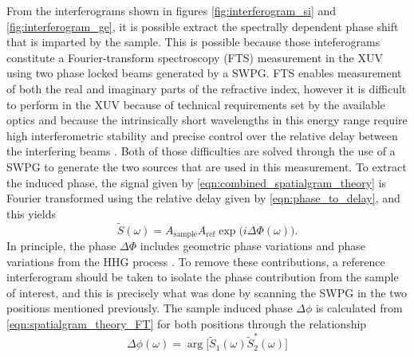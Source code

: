From the interferograms shown in figures \ref{fig:interferogram_si} and \ref{fig:interferogram_ge}, it is possible extract the spectrally dependent phase shift that is imparted by the sample.  This is possible because those inteferograms constitute a Fourier-transform spectroscopy (FTS) measurement in the XUV using two phase locked beams generated by a SWPG.  FTS enables measurement of both the real and imaginary parts of the refractive index, however it is difficult to perform in the XUV because of technical requirements set by the available optics and because the intrinsically short wavelengths in this energy range require high interferometric stability and precise control over the relative delay between the interfering beams \cite{jansenSpatiallyResolvedFourier2016, jansenBroadbandExtremeUltraviolet2019, kovacevExtremeUltravioletFourierTransform2005, deoliveiraHighresolutionBroadbandwidthFouriertransform2011}.  Both of those difficulties are solved through the use of a SWPG to generate the two sources that are used in this measurement.  To extract the induced phase, the signal given by \ref{eqn:combined_spatialgram_theory} is Fourier transformed using the relative delay given by \ref{eqn:phase_to_delay}, and this yields
\begin{equation}
	\label{eqn:spatialgram_theory_FT}
	\tilde{S}(\omega) = A_{\mathrm{sample}}A_{\mathrm{ref}}\exp\big(i\Delta\Phi(\omega)\big).
\end{equation}
In principle, the phase $\Delta\Phi$ includes geometric phase variations and phase variations from the HHG process \cite{jansenBroadbandExtremeUltraviolet2019}.  To remove these contributions, a reference interferogram should be taken to isolate the phase contribution from the sample of interest, and this is precisely what was done by scanning the SWPG in the two positions mentioned previously.  The sample induced phase $\Delta\phi$ is calculated from \ref{eqn:spatialgram_theory_FT} for both positions through the relationship
\begin{equation}
	\label{eqn:measured_spectral_phase}
	\Delta\phi(\omega) = \arg\big[ \tilde{S}_{1}(\omega) \tilde{S}_{2}^{\ast}(\omega) \big]
\end{equation}
